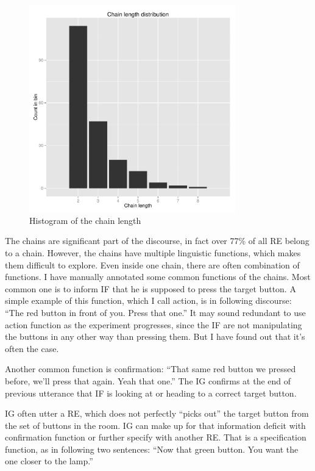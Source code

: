 \begin{figure}[!htbp]
  \centering
	\includegraphics[width=0.8\textwidth]{Images/chains_len_histo}
	\caption{Histogram of the chain length}
	\label{fig:chains_len_histo}
\end{figure}


The chains are significant part of the discourse, in fact over 77\% of all RE belong to a chain. However, the chains have multiple linguistic functions, which makes them difficult to explore. Even inside one chain, there are often combination of functions. I have manually annotated some common functions of the chains. Most common one is to inform IF that he is supposed to press the target button. A simple example of this function, which I call action, is in following discourse: ``The red button in front of you. Press that one.'' It may sound redundant to use action function as the experiment progresses, since the IF are not manipulating the buttons in any other way than pressing them. But I have found out that it's often the case.

Another common function is confirmation: ``That same red button we pressed before, we'll press that again. Yeah that one.'' The IG confirms at the end of previous utterance that IF is looking at or heading to a correct target button.

IG often utter a RE, which does not perfectly ``picks out'' the target button from the set of buttons in the room. IG can make up for that information deficit with confirmation function or further specify with another RE. That is a specification function, as in following two sentences: ``Now that green button. You want the one closer to the lamp.''

